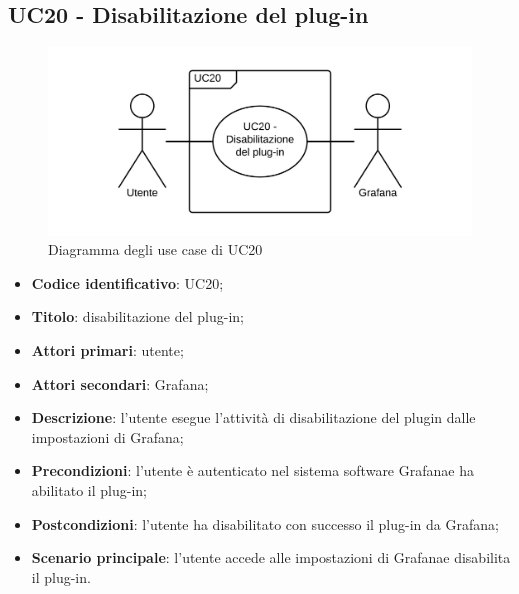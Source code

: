 \subsection{UC20 - Disabilitazione del plug-in}
\begin{figure}[H]
	\includegraphics{img/UC20_-_Disabilitazione_del_plug-in.png}
	\caption{Diagramma degli use case di UC20}
\end{figure}
\begin{itemize}
	\item \textbf{Codice identificativo}: UC20;
	\item \textbf{Titolo}: disabilitazione del plug-in;
	\item \textbf{Attori primari}: utente;
	\item \textbf{Attori secondari}: Grafana\glo;
	\item \textbf{Descrizione}: l'utente esegue l'attività di disabilitazione del plugin dalle impostazioni di Grafana\glo;
	\item \textbf{Precondizioni}: l'utente è autenticato nel sistema software Grafana\glosp e ha abilitato il plug-in;
	\item \textbf{Postcondizioni}: l'utente ha disabilitato con successo il plug-in da Grafana\glo;
	\item \textbf{Scenario principale}: l'utente accede alle impostazioni di Grafana\glosp e disabilita il plug-in.
\end{itemize}
